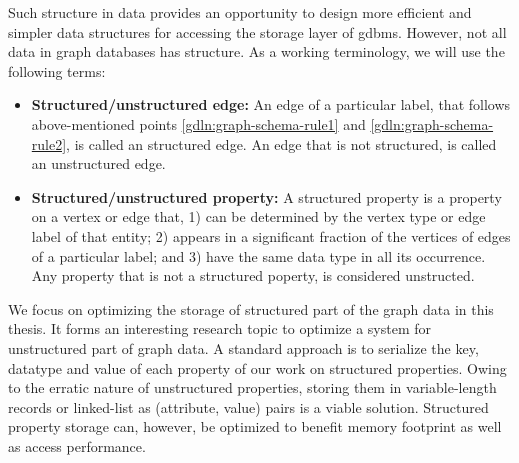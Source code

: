 \begin{guideline}
Such structure in data provides an opportunity to design more efficient and simpler data structures for accessing the storage layer of \gls{gdbms}. However, not all data in graph databases has structure. As a working terminology, we will use the following terms:


\begin{itemize}
	\item \textbf{Structured/unstructured edge:} An edge of a particular label, that follows above-mentioned points \ref{gdln:graph-schema-rule1} and \ref{gdln:graph-schema-rule2}, is called an structured edge. An edge that is not structured, is called an unstructured edge.
	 
	\item \textbf{Structured/unstructured property:} A structured property is a property on a vertex or edge that, 1) can be determined by the vertex type or edge label of that entity; 2) appears in a significant fraction of the vertices of edges of a particular label; and 3) have the same data type in all its occurrence. Any property that is not a structured poperty, is considered unstructed.
	
\end{itemize}


We focus on optimizing the storage of structured part of the graph data in this thesis. It forms an interesting research topic to optimize a system for unstructured part of graph data. A standard approach is to serialize the key, datatype and value of each property  of our work on structured properties. Owing to the erratic nature of unstructured properties, storing them in variable-length records or linked-list as (attribute, value) pairs is a viable solution. Structured property storage can, however, be optimized to benefit memory footprint as well as access performance.

\end{guideline}

